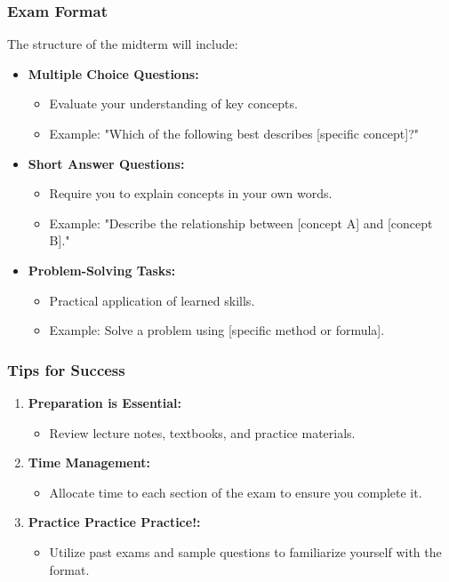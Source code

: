 \documentclass[aspectratio=169]{beamer}
\begin{document}
\begin{frame}[fragile]
    \frametitle{Exam Format}
    The structure of the midterm will include:
    \begin{itemize}
        \item \textbf{Multiple Choice Questions:} 
            \begin{itemize}
                \item Evaluate your understanding of key concepts.
                \item Example: "Which of the following best describes [specific concept]?"
            \end{itemize}
        \item \textbf{Short Answer Questions:}
            \begin{itemize}
                \item Require you to explain concepts in your own words.
                \item Example: "Describe the relationship between [concept A] and [concept B]."
            \end{itemize}
        \item \textbf{Problem-Solving Tasks:}
            \begin{itemize}
                \item Practical application of learned skills.
                \item Example: Solve a problem using [specific method or formula].
            \end{itemize}
    \end{itemize}
\end{frame}

\begin{frame}[fragile]
    \frametitle{Tips for Success}
    \begin{enumerate}
        \item \textbf{Preparation is Essential:} 
            \begin{itemize}
                \item Review lecture notes, textbooks, and practice materials.
            \end{itemize}
        \item \textbf{Time Management:} 
            \begin{itemize}
                \item Allocate time to each section of the exam to ensure you complete it.
            \end{itemize}
        \item \textbf{Practice Practice Practice!:} 
            \begin{itemize}
                \item Utilize past exams and sample questions to familiarize yourself with the format.
            \end{itemize}
    \end{enumerate}
\end{frame}
\end{document}
